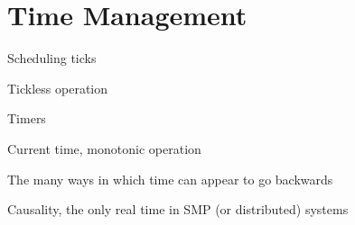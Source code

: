 
\chapter{Time Management}
\label{sec:time:Time Management}

Scheduling ticks

Tickless operation

Timers

Current time, monotonic operation

The many ways in which time can appear to go backwards

Causality, the only real time in SMP (or distributed) systems
